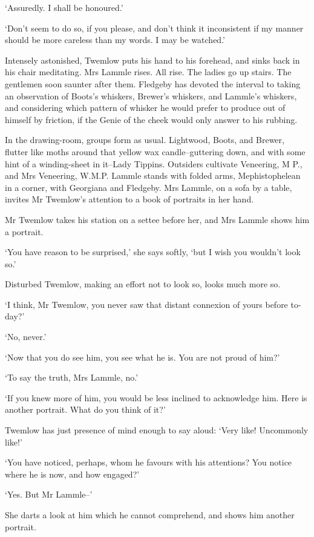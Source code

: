‘Assuredly. I shall be honoured.’

‘Don’t seem to do so, if you please, and don’t think it inconsistent if
my manner should be more careless than my words. I may be watched.’

Intensely astonished, Twemlow puts his hand to his forehead, and sinks
back in his chair meditating. Mrs Lammle rises. All rise. The ladies go
up stairs. The gentlemen soon saunter after them. Fledgeby has devoted
the interval to taking an observation of Boots’s whiskers, Brewer’s
whiskers, and Lammle’s whiskers, and considering which pattern of
whisker he would prefer to produce out of himself by friction, if the
Genie of the cheek would only answer to his rubbing.

In the drawing-room, groups form as usual. Lightwood, Boots, and Brewer,
flutter like moths around that yellow wax candle--guttering down,
and with some hint of a winding-sheet in it--Lady Tippins. Outsiders
cultivate Veneering, M P., and Mrs Veneering, W.M.P. Lammle stands with
folded arms, Mephistophelean in a corner, with Georgiana and Fledgeby.
Mrs Lammle, on a sofa by a table, invites Mr Twemlow’s attention to a
book of portraits in her hand.

Mr Twemlow takes his station on a settee before her, and Mrs Lammle
shows him a portrait.

‘You have reason to be surprised,’ she says softly, ‘but I wish you
wouldn’t look so.’

Disturbed Twemlow, making an effort not to look so, looks much more so.

‘I think, Mr Twemlow, you never saw that distant connexion of yours
before to-day?’

‘No, never.’

‘Now that you do see him, you see what he is. You are not proud of him?’

‘To say the truth, Mrs Lammle, no.’

‘If you knew more of him, you would be less inclined to acknowledge him.
Here is another portrait. What do you think of it?’

Twemlow has just presence of mind enough to say aloud: ‘Very like!
Uncommonly like!’

‘You have noticed, perhaps, whom he favours with his attentions? You
notice where he is now, and how engaged?’

‘Yes. But Mr Lammle--’

She darts a look at him which he cannot comprehend, and shows him
another portrait.

